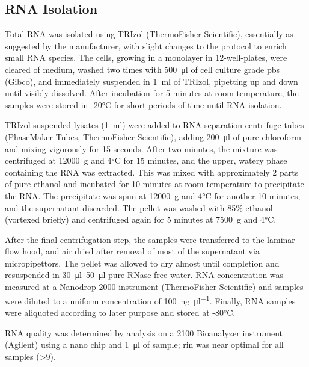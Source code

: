 \begin{method}

\subsection{RNA Isolation}

Total RNA was isolated using TRIzol (ThermoFisher Scientific), essentially as suggested by the manufacturer, with slight changes to the protocol to enrich small RNA species. The cells, growing in a monolayer in 12-well-plates, were cleared of medium, washed two times with \SI{500}{\micro\litre} of cell culture grade \ac{pbs} (Gibco), and immediately suspended in \SI{1}{\milli\litre} of TRIzol, pipetting up and down until visibly dissolved. After incubation for 5 minutes at room temperature, the samples were stored in -20°C for short periods of time until RNA isolation.

TRIzol-suspended lysates (\SI{1}{\milli\litre}) were added to RNA-separation centrifuge tubes (PhaseMaker Tubes, ThermoFisher Scientific), adding \SI{200}{\micro\litre} of pure chloroform and mixing vigorously for 15 seconds. After two minutes, the mixture was centrifuged at \SI{12000}{\g} and 4°C for 15 minutes, and the upper, watery phase containing the RNA was extracted. This was mixed with approximately 2 parts of pure ethanol and incubated for 10 minutes at room temperature to precipitate the RNA. The precipitate was spun at \SI{12000}{\g} and 4°C for another 10 minutes, and the supernatant discarded. The pellet was washed with 85\% ethanol (vortexed briefly) and centrifuged again for 5 minutes at \SI{7500}{\g} and 4°C.

After the final centrifugation step, the samples were transferred to the laminar flow hood, and air dried after removal of most of the supernatant via micropipettors. The pellet was allowed to dry almost until completion and resuspended in \SIrange{30}{50}{\micro\litre} pure RNase-free water. RNA concentration was measured at a Nanodrop 2000 instrument (ThermoFisher Scientific) and samples were diluted to a uniform concentration of \SI{100}{\nano\gram\per\micro\litre}. Finally, RNA samples were aliquoted according to later purpose and stored at -80°C.

RNA quality was determined by analysis on a 2100 Bioanalyzer instrument (Agilent) using a nano chip and \SI{1}{\micro\litre} of sample; \ac{rin} was near optimal for all samples (>9).


\end{method}
